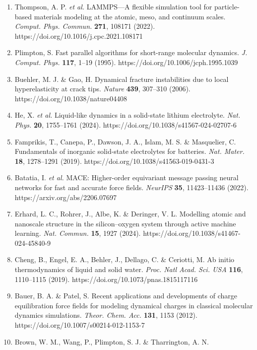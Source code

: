 \documentclass[
  11pt,
]{article}
\begin{document}
\begin{enumerate}
\def\labelenumi{\arabic{enumi}.}
\item
  Thompson, A. P. \emph{et al.} LAMMPS---A flexible simulation tool for
  particle-based materials modeling at the atomic, meso, and continuum
  scales. \emph{Comput. Phys. Commun.} \textbf{271}, 108171 (2022).
  https://doi.org/10.1016/j.cpc.2021.108171
\item
  Plimpton, S. Fast parallel algorithms for short-range molecular
  dynamics. \emph{J. Comput. Phys.} \textbf{117}, 1--19 (1995).
  https://doi.org/10.1006/jcph.1995.1039
\item
  Buehler, M. J. \& Gao, H. Dynamical fracture instabilities due to
  local hyperelasticity at crack tips. \emph{Nature} \textbf{439},
  307--310 (2006). https://doi.org/10.1038/nature04408
\item
  He, X. \emph{et al.} Liquid-like dynamics in a solid-state lithium
  electrolyte. \emph{Nat. Phys.} \textbf{20}, 1755--1761 (2024).
  https://doi.org/10.1038/s41567-024-02707-6
\item
  Famprikis, T., Canepa, P., Dawson, J. A., Islam, M. S. \& Masquelier,
  C. Fundamentals of inorganic solid-state electrolytes for batteries.
  \emph{Nat. Mater.} \textbf{18}, 1278--1291 (2019).
  https://doi.org/10.1038/s41563-019-0431-3
\item
  Batatia, I. \emph{et al.} MACE: Higher-order equivariant message
  passing neural networks for fast and accurate force fields.
  \emph{NeurIPS} \textbf{35}, 11423--11436 (2022).
  https://arxiv.org/abs/2206.07697
\item
  Erhard, L. C., Rohrer, J., Albe, K. \& Deringer, V. L. Modelling
  atomic and nanoscale structure in the silicon--oxygen system through
  active machine learning. \emph{Nat. Commun.} \textbf{15}, 1927 (2024).
  https://doi.org/10.1038/s41467-024-45840-9
\item
  Cheng, B., Engel, E. A., Behler, J., Dellago, C. \& Ceriotti, M. Ab
  initio thermodynamics of liquid and solid water. \emph{Proc. Natl
  Acad. Sci. USA} \textbf{116}, 1110--1115 (2019).
  https://doi.org/10.1073/pnas.1815117116
\item
  Bauer, B. A. \& Patel, S. Recent applications and developments of
  charge equilibration force fields for modeling dynamical charges in
  classical molecular dynamics simulations. \emph{Theor. Chem. Acc.}
  \textbf{131}, 1153 (2012). https://doi.org/10.1007/s00214-012-1153-7
\item
  Brown, W. M., Wang, P., Plimpton, S. J. \& Tharrington, A. N.

\end{enumerate}
\end{document}
